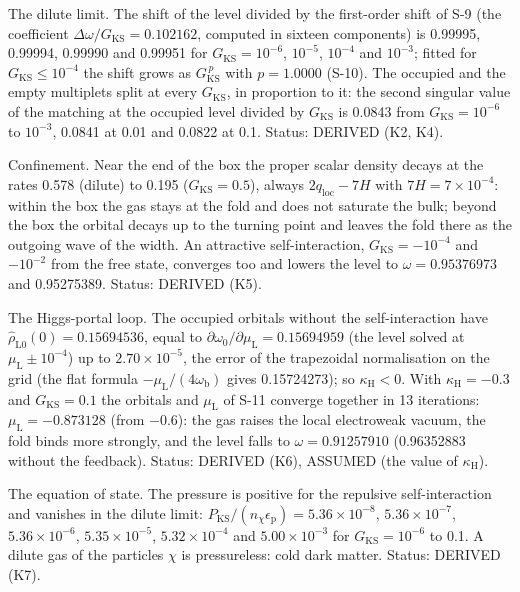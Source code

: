 \documentclass[
  10pt,
]{article}
\begin{document}
The dilute limit. The shift of the level divided by the first-order
shift of S-9 (the coefficient
\(\Delta\omega/G_{\mathrm{KS}} = 0.102162\), computed in sixteen
components) is 0.99995, 0.99994, 0.99990 and 0.99951 for
\(G_{\mathrm{KS}} = 10^{-6}\), \(10^{-5}\), \(10^{-4}\) and \(10^{-3}\);
fitted for \(G_{\mathrm{KS}} \le 10^{-4}\) the shift grows as
\(G_{\mathrm{KS}}^{\,p}\) with \(p = 1.0000\) (S-10). The occupied and
the empty multiplets split at every \(G_{\mathrm{KS}}\), in proportion
to it: the second singular value of the matching at the occupied level
divided by \(G_{\mathrm{KS}}\) is 0.0843 from
\(G_{\mathrm{KS}} = 10^{-6}\) to \(10^{-3}\), 0.0841 at 0.01 and 0.0822
at 0.1. Status: DERIVED (K2, K4).

Confinement. Near the end of the box the proper scalar density decays at
the rates 0.578 (dilute) to 0.195 (\(G_{\mathrm{KS}} = 0.5\)), always
\(2q_{\mathrm{loc}} - 7H\) with \(7H = 7\times10^{-4}\): within the box
the gas stays at the fold and does not saturate the bulk; beyond the box
the orbital decays up to the turning point and leaves the fold there as
the outgoing wave of the width. An attractive self-interaction,
\(G_{\mathrm{KS}} = -10^{-4}\) and \(-10^{-2}\) from the free state,
converges too and lowers the level to \(\omega = 0.95376973\) and
0.95275389. Status: DERIVED (K5).

The Higgs-portal loop. The occupied orbitals without the
self-interaction have \(\hat\rho_{\mathrm{L}0}(0) = 0.15694536\), equal
to \(\partial\omega_0/\partial\mu_{\mathrm{L}} = 0.15694959\) (the level
solved at \(\mu_{\mathrm{L}} \pm 10^{-4}\)) up to \(2.70\times10^{-5}\),
the error of the trapezoidal normalisation on the grid (the flat formula
\(-\mu_{\mathrm{L}}/(4\omega_{\mathrm{b}})\) gives 0.15724273); so
\(\kappa_{\mathrm{H}} < 0\). With \(\kappa_{\mathrm{H}} = -0.3\) and
\(G_{\mathrm{KS}} = 0.1\) the orbitals and \(\mu_{\mathrm{L}}\) of S-11
converge together in 13 iterations: \(\mu_{\mathrm{L}} = -0.873128\)
(from \(-0.6\)): the gas raises the local electroweak vacuum, the fold
binds more strongly, and the level falls to \(\omega = 0.91257910\)
(0.96352883 without the feedback). Status: DERIVED (K6), ASSUMED (the
value of \(\kappa_{\mathrm{H}}\)).

The equation of state. The pressure is positive for the repulsive
self-interaction and vanishes in the dilute limit:
\(P_{\mathrm{KS}}/(n_\chi\epsilon_{\mathrm{p}}) = 5.36\times10^{-8}\),
\(5.36\times10^{-7}\), \(5.36\times10^{-6}\), \(5.35\times10^{-5}\),
\(5.32\times10^{-4}\) and \(5.00\times10^{-3}\) for
\(G_{\mathrm{KS}} = 10^{-6}\) to 0.1. A dilute gas of the particles
\(\chi\) is pressureless: cold dark matter. Status: DERIVED (K7).
\end{document}
